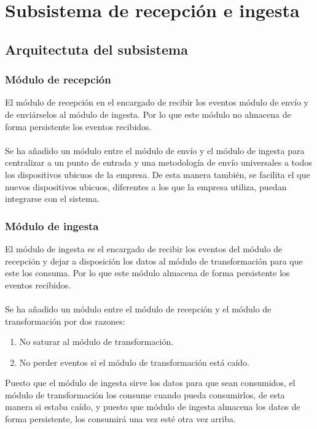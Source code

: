 \chapter{Subsistema de recepción e ingesta}

\section{Arquitectuta del subsistema}

\subsection{Módulo de recepción}

El módulo de recepción en el encargado de recibir los eventos módulo de envío y de enviárselos al módulo de ingesta. Por lo que este módulo no almacena de forma persistente los eventos recibidos.
\\\\
Se ha añadido un módulo entre el módulo de envío y el módulo de ingesta para centralizar a un punto de entrada y una metodología de envío universales a todos los dispositivos ubicuos de la empresa. De esta manera también, se facilita el que nuevos dispositivos ubicuos, diferentes a los que la empresa utiliza, puedan integrarse con el sistema.

\subsection{Módulo de ingesta}

El módulo de ingesta es el encargado de recibir los eventos del módulo de recepción y dejar a disposición los datos al módulo de transformación para que este los consuma. Por lo que este módulo almacena de forma persistente los eventos recibidos.
\\\\
Se ha añadido un módulo entre el módulo de recepción y el módulo de transformación por dos razones:

\begin{enumerate}
	\item No saturar al módulo de transformación.
	\item No perder eventos si el módulo de transformación está caído.
\end{enumerate}

Puesto que el módulo de ingesta sirve los datos para que sean consumidos, el módulo de transformación los consume cuando pueda consumirlos, de esta manera si estaba caído, y puesto que módulo de ingesta almacena los datos de forma persistente, los consumirá una vez esté otra vez arriba.


